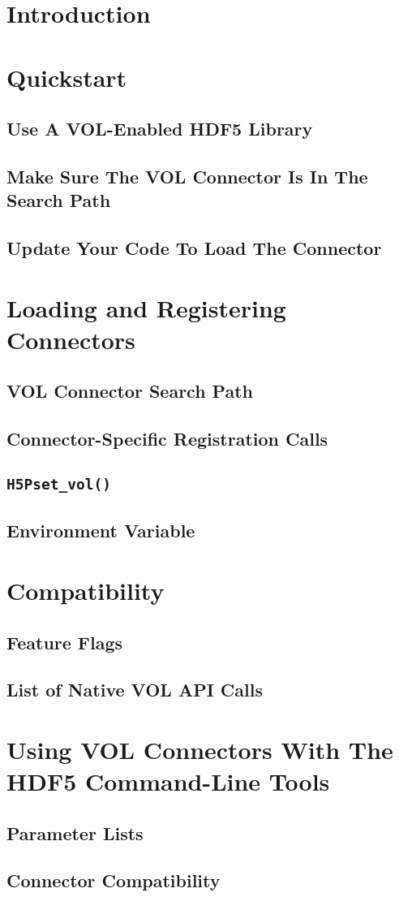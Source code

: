 

\section{Introduction}

\section{Quickstart}
\subsection*{Use A VOL-Enabled HDF5 Library}
\subsection*{Make Sure The VOL Connector Is In The Search Path}
\subsection*{Update Your Code To Load The Connector}

\section{Loading and Registering Connectors}
\subsection{VOL Connector Search Path}
\subsection{Connector-Specific Registration Calls}
\subsection{\tt H5Pset\_vol()}
\subsection{Environment Variable}

\section{Compatibility}
\subsection{Feature Flags}
\subsection{List of Native VOL API Calls}

\section{Using VOL Connectors With The HDF5 Command-Line Tools}
\subsection{Parameter Lists}
\subsection{Connector Compatibility}

